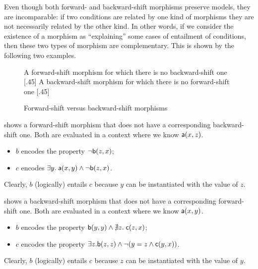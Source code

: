 \medskip\noindent
Even though both forward- and backward-shift morphisms preserve models, they are incomparable: if two conditions are related by one kind of morphisms they are not necessarily related by the other kind. In other words, if we consider the existence of a morphism as ``explaining'' some cases of entailment of conditions, then these two types of morphism are complementary. This is shown by the following two examples.
%
\begin{figure}
\centering
\subcaptionbox
  {A forward-shift morphism for which there is no backward-shift one
  }
  [.45\textwidth]
  {}
  \qquad
\subcaptionbox
  {A backward-shift morphism for which there is no forward-shift one
  }
  [.45\textwidth]
  {}
\caption{Forward-shift versus backward-shift morphisms}
\end{figure}
%
\begin{example}
 shows a forward-shift morphism that does not have a corresponding backward-shift one. Both are evaluated in a context where we know $\mathsf{a}(x,z)$.
\begin{itemize}
\item $b$ encodes the property $\neg \mathsf{b}(z,x)$;
\item $c$ encodes $\exists y.\; \mathsf{a}(x,y) \wedge \neg \mathsf{b}(z,x)$.
\end{itemize}
Clearly, $b$ (logically) entails $c$ because $y$ can be instantiated with the value of $z$.
\end{example}
%
\begin{example}
 shows a backward-shift morphism that does not have a corresponding forward-shift one. Both are evaluated in a context where we know $\mathsf{a}(x,y)$.
\begin{itemize}
\item $b$ encodes the property $\mathsf{b}(y,y) \wedge \nexists z.\; \mathsf{c}(z,x)$;
\item $c$ encodes the property $\exists z.\mathsf{b}(z,z) \wedge \neg(y=z \wedge \mathsf{c}(y,x))$.
\end{itemize}
Clearly, $b$ (logically) entails $c$ because $z$ can be instantiated with the value of $y$.
\end{example}
